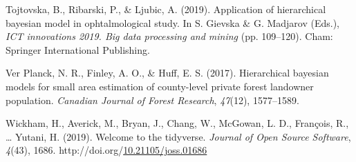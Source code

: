 \documentclass[12pt,twoside]{reedthesis}
\newlength{\cslhangindent}
\newenvironment{CSLReferences}[2] %
 {%
  \setlength{\parindent}{0pt}
  \ifodd #1 \everypar{\setlength{\hangindent}{\cslhangindent}}\ignorespaces\fi
  \ifnum #2 > 0
  \setlength{\parskip}{#2\baselineskip}
  \fi
 }%
 {}
\begin{document}
\begin{CSLReferences}{1}{0}
\leavevmode{}%
Tojtovska, B., Ribarski, P., \& Ljubic, A. (2019). Application of hierarchical bayesian model in ophtalmological study. In S. Gievska \& G. Madjarov (Eds.), \emph{ICT innovations 2019. Big data processing and mining} (pp. 109--120). Cham: Springer International Publishing.

\leavevmode{}%
Ver Planck, N. R., Finley, A. O., \& Huff, E. S. (2017). Hierarchical bayesian models for small area estimation of county-level private forest landowner population. \emph{Canadian Journal of Forest Research}, \emph{47}(12), 1577--1589.

\leavevmode{}%
Wickham, H., Averick, M., Bryan, J., Chang, W., McGowan, L. D., François, R., \ldots{} Yutani, H. (2019). Welcome to the {tidyverse}. \emph{Journal of Open Source Software}, \emph{4}(43), 1686. http://doi.org/\href{https://doi.org/10.21105/joss.01686}{10.21105/joss.01686}

\end{CSLReferences}

\end{document}
